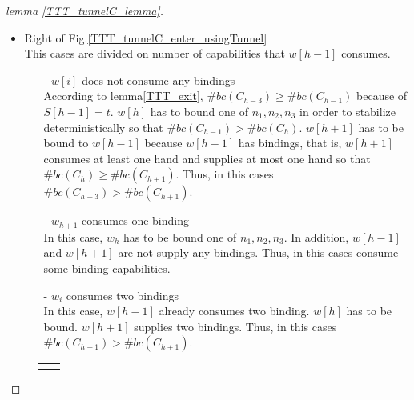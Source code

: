 \documentclass[runningheads]{llncs}
\begin{document}
\begin{proof}[lemma \ref{TTT_tunnelC_lemma}]
\begin{itemize}
\item{Right of Fig.\ref{TTT_tunnelC_enter_usingTunnel}}\\
  This cases are divided on number of capabilities that $w[h-1]$ consumes.
  \begin{itemize}
  \item[-]{$w[i]$ does not consume any bindings}\\
  According to lemma\ref{TTT_exit}, $\#bc(C_{h-3}) \geq \#bc(C_{h-1})$ because of $S[h-1] = t$.
    $w[h]$ has to bound one of $n_1, n_2, n_3$ in order to stabilize deterministically so that  $\#bc(C_{h-1}) > \#bc(C_{h})$.
    $w[h+1]$ has to be bound to $w[h-1]$ because $w[h-1]$ has bindings, that is, $w[h+1]$ consumes at least one hand and supplies at most one hand so that $\#bc(C_{h}) \geq \#bc(C_{h+1})$. Thus, in this cases $\#bc(C_{h-3}) > \#bc(C_{h+1})$.

  \item[-]{$w_{h+1}$ consumes one binding}\\
    In this case, $w_{h}$ has to be bound one of $n_1, n_2, n_3$. In addition, $w[h-1]$ and $w[h+1]$ are not supply any bindings. Thus, in this cases consume some binding capabilities.
  \item[-]{$w_i$ consumes two bindings}\\
    In this case, $w[h-1]$ already consumes two binding. $w[h]$ has to be bound. $w[h+1]$ supplies two bindings. Thus, in this cases $\#bc(C_{h-1}) > \#bc(C_{h+1})$.
   
  \end{itemize}
\end{itemize}
\begin{figure}
  \centering
    \begin{tabular}{cc}
      
      \begin{minipage}{0.48\hsize}
      \centering
        \begin{tikzpicture}


\end{tikzpicture}
\end{minipage}
\end{tabular}
\end{figure}
\end{proof}
\end{document}
